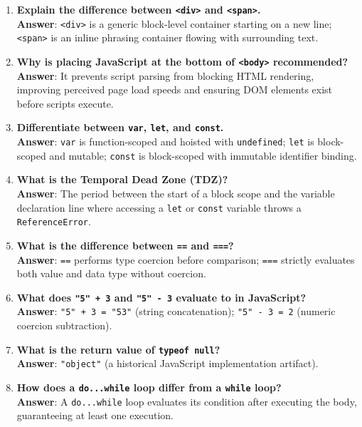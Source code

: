 \begin{enumerate}[leftmargin=1.5em]
    \item \textbf{Explain the difference between \texttt{<div>} and \texttt{<span>}.}\\
    \textbf{Answer}: \texttt{<div>} is a generic block-level container starting on a new line; \texttt{<span>} is an inline phrasing container flowing with surrounding text.

    \item \textbf{Why is placing JavaScript at the bottom of \texttt{<body>} recommended?}\\
    \textbf{Answer}: It prevents script parsing from blocking HTML rendering, improving perceived page load speeds and ensuring DOM elements exist before scripts execute.

    \item \textbf{Differentiate between \texttt{var}, \texttt{let}, and \texttt{const}.}\\
    \textbf{Answer}: \texttt{var} is function-scoped and hoisted with \texttt{undefined}; \texttt{let} is block-scoped and mutable; \texttt{const} is block-scoped with immutable identifier binding.

    \item \textbf{What is the Temporal Dead Zone (TDZ)?}\\
    \textbf{Answer}: The period between the start of a block scope and the variable declaration line where accessing a \texttt{let} or \texttt{const} variable throws a \texttt{ReferenceError}.

    \item \textbf{What is the difference between \texttt{==} and \texttt{===}?}\\
    \textbf{Answer}: \texttt{==} performs type coercion before comparison; \texttt{===} strictly evaluates both value and data type without coercion.

    \item \textbf{What does \texttt{"5" + 3} and \texttt{"5" - 3} evaluate to in JavaScript?}\\
    \textbf{Answer}: \texttt{"5" + 3 = "53"} (string concatenation); \texttt{"5" - 3 = 2} (numeric coercion subtraction).

    \item \textbf{What is the return value of \texttt{typeof null}?}\\
    \textbf{Answer}: \texttt{"object"} (a historical JavaScript implementation artifact).

    \item \textbf{How does a \texttt{do...while} loop differ from a \texttt{while} loop?}\\
    \textbf{Answer}: A \texttt{do...while} loop evaluates its condition after executing the body, guaranteeing at least one execution.


\end{enumerate}
